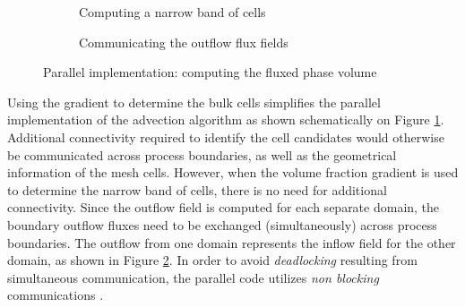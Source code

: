 \begin{figure}
   \begin{subfigure}[b]{0.45\columnwidth}
       \centering
       \def\svgwidth{0.6\columnwidth}
       {\footnotesize
           
       }
       \caption{Computing a narrow band of cells} 
       \label{fig:parallel:gradZeroCondition}
   \end{subfigure}
   \begin{subfigure}[b]{0.45\columnwidth}
       \centering
       \def\svgwidth{0.6\columnwidth}
       {\footnotesize
           
       }   
       \caption{Communicating the outflow flux fields}
       \label{fig:parallel:communication}
   \end{subfigure}

    \caption{Parallel implementation: computing the fluxed phase volume}    
    \label{fig:parallel:sphereFine}
\end{figure}

Using the gradient to determine the bulk cells simplifies the parallel
implementation of the advection algorithm as shown schematically on Figure
\ref{fig:parallel:gradZeroCondition}. Additional connectivity required to
identify the cell candidates would otherwise be communicated across process
boundaries, as well as the geometrical information of the mesh cells. However,
when the volume fraction gradient is used to determine the narrow band of
cells, there is no need for additional connectivity. Since the outflow field is
computed for each separate domain, the boundary outflow fluxes need to be
exchanged (simultaneously) across process boundaries. The outflow from one
domain represents the inflow field for the other domain, as shown in Figure
\ref{fig:parallel:communication}. In order to avoid \emph{deadlocking}
resulting from simultaneous communication, the parallel code utilizes \emph{non
blocking} communications \citep{OpenMPI}. 
